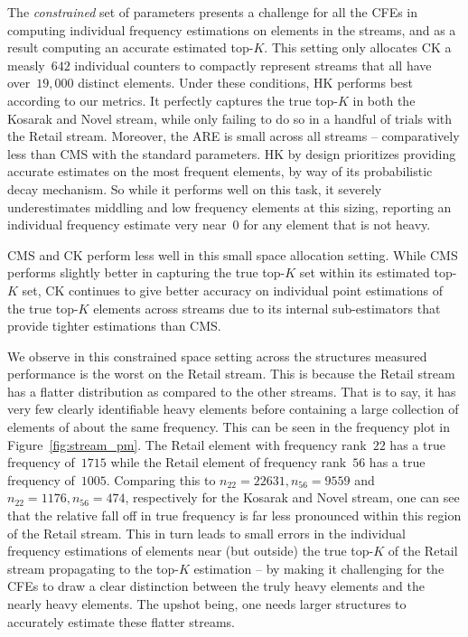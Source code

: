 The \emph{constrained} set of parameters presents a challenge for all the CFEs in computing individual frequency estimations on elements in the streams, and as a result computing an accurate estimated top-$K$. This setting only allocates CK a measly~$642$ individual counters to compactly represent streams that all have over~$19,000$ distinct elements. Under these conditions, HK performs best according to our metrics. It perfectly captures the true top-$K$ in both the Kosarak and Novel stream, while only failing to do so in a handful of trials with the Retail stream. Moreover, the ARE is small across all streams -- comparatively less than CMS with the standard parameters. HK by design prioritizes providing accurate estimates on the most frequent elements, by way of its probabilistic decay mechanism. So while it performs well on this task, it severely underestimates middling and low frequency elements at this sizing, reporting an individual frequency estimate very near~$0$ for any element that is not heavy. %

 CMS and CK perform less well in this small space allocation setting. While CMS performs slightly better in capturing the true top-$K$ set within its estimated top-$K$ set, CK continues to give better accuracy on individual point estimations of the true top-$K$ elements across streams due to its internal sub-estimators that provide tighter estimations than CMS.

We observe in this constrained space setting across the structures measured performance is the worst on the Retail stream. This is because the Retail stream has a flatter distribution as compared to the other streams. That is to say, it has very few clearly identifiable heavy elements before containing a large collection of elements of about the same frequency. This can be seen in the frequency plot in Figure~\ref{fig:stream_pm}. The Retail element with frequency rank~$22$ has a true frequency of~$1715$ while the Retail element of frequency rank~$56$ has a true frequency of~$1005$. Comparing this to $n_{22} = 22631, n_{56} = 9559$ and~$n_{22} = 1176, n_{56} = 474$, respectively for the Kosarak and Novel stream, one can see that the relative fall off in true frequency is far less pronounced within this region of the Retail stream. This in turn leads to small errors in the individual frequency estimations of elements near (but outside) the true top-$K$ of the Retail stream propagating to the top-$K$ estimation -- by making it challenging for the CFEs to draw a clear distinction between the truly heavy elements and the nearly heavy elements. The upshot being, one needs larger structures to accurately estimate these flatter streams.

